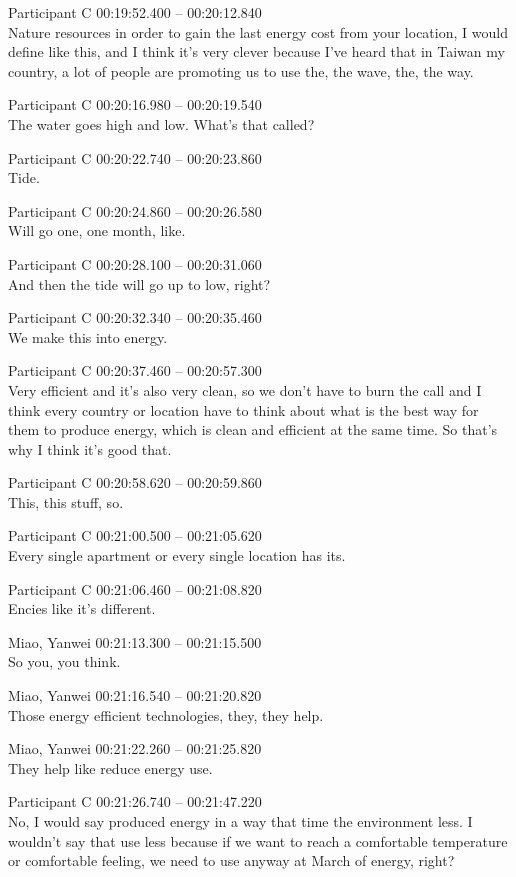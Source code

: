 {Participant C 00:19:52.400 -- 00:20:12.840 \\
Nature resources in order to gain the last energy cost from your location, I would define like this, and I think it's very clever because I've heard that in Taiwan my country, a lot of people are promoting us to use the, the wave, the, the way.

Participant C 00:20:16.980 -- 00:20:19.540 \\
The water goes high and low. What's that called?

Participant C 00:20:22.740 -- 00:20:23.860 \\
Tide.

Participant C 00:20:24.860 -- 00:20:26.580 \\
Will go one, one month, like.

Participant C 00:20:28.100 -- 00:20:31.060 \\
And then the tide will go up to low, right?

Participant C 00:20:32.340 -- 00:20:35.460 \\
We make this into energy.

Participant C 00:20:37.460 -- 00:20:57.300 \\
Very efficient and it's also very clean, so we don't have to burn the call and I think every country or location have to think about what is the best way for them to produce energy, which is clean and efficient at the same time. So that's why I think it's good that.

Participant C 00:20:58.620 -- 00:20:59.860 \\
This, this stuff, so.

Participant C 00:21:00.500 -- 00:21:05.620 \\
Every single apartment or every single location has its.

Participant C 00:21:06.460 -- 00:21:08.820 \\
Encies like it's different.

Miao, Yanwei 00:21:13.300 -- 00:21:15.500 \\
So you, you think.

Miao, Yanwei 00:21:16.540 -- 00:21:20.820 \\
Those energy efficient technologies, they, they help.

Miao, Yanwei 00:21:22.260 -- 00:21:25.820 \\
They help like reduce energy use.

Participant C 00:21:26.740 -- 00:21:47.220 \\
No, I would say produced energy in a way that time the environment less. I wouldn't say that use less because if we want to reach a comfortable temperature or comfortable feeling, we need to use anyway at March of energy, right?

}
